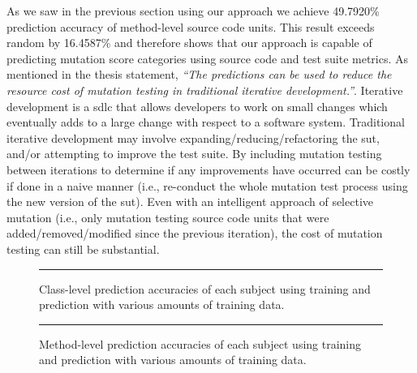 \noindent
As we saw in the previous section using our approach we achieve 49.7920\% prediction accuracy of method-level source code units. This result exceeds random by 16.4587\% and therefore shows that our approach is capable of predicting mutation score categories using source code and test suite metrics. As mentioned in the thesis statement, \emph{``The predictions can be used to reduce the resource cost of mutation testing in traditional iterative development.''}. Iterative development is a \gls{sdlc} that allows developers to work on small changes which eventually adds to a large change with respect to a software system. Traditional iterative development may involve expanding/reducing/refactoring the \gls{sut}, and/or attempting to improve the test suite. By including mutation testing between iterations to determine if any improvements have occurred can be costly if done in a naive manner (i.e., re-conduct the whole mutation test process using the new version of the \gls{sut}). Even with an intelligent approach of selective mutation (i.e., only mutation testing source code units that were added/removed/modified since the previous iteration), the cost of mutation testing can still be substantial.

\begin{figure}[!tb]
  \centering
  \begin{adjustbox}{max size={.95\textwidth}{.95\textheight}}
    
  \end{adjustbox}
  \caption{Class-level prediction accuracies of each subject using training and prediction with various amounts of training data.}
  \vspace{2mm}
  \hrule
  \label{fig:divisor_class_graph}
\end{figure}

\begin{figure}[!tb]
  \centering
  \begin{adjustbox}{max size={.95\textwidth}{.95\textheight}}
    
  \end{adjustbox}
  \caption{Method-level prediction accuracies of each subject using training and prediction with various amounts of training data.}
  \vspace{2mm}
  \hrule
  \label{fig:divisor_method_graph}
\end{figure}

